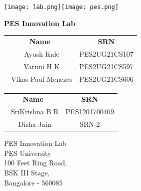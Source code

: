 \documentclass[12pt]{report}
\begin{document}
 

\begin{titlepage}
\texttt{[image: lab.png]}\hfill \texttt{[image: pes.png]}

\begin{center}
\vspace*{1cm}

\textbf{\Large{PES Innovation Lab}}

\vspace{0.3cm}
\vspace{0.1cm}
       
       
\vspace{0.8cm}
            
\vspace{0.8cm}
       
\vspace{0.2cm}
       
\begin{tabular}{c c}    
    \textbf{Name} & 
    \textbf{SRN} \\[0.5cm]
    \ {Ayush Kale} & {PES2UG21CS107} \\
    \ {Varuni H K} & {PES2UG21CS597} \\
    \ {Vikas Paul Menezes} & {PES2UG21CS606} \\         
\end{tabular}
\vspace{0.5cm}

\vspace{0.2cm}
       
\begin{tabular}{c c}
    \textbf{Name} & 
    \textbf{SRN} \\[0.5cm]
    \ {SriKrishna B R} & {PES1201700469} \\
    \ {Disha Jain} & {SRN-2} \\
\end{tabular}
       
\vfill
\vspace{0.5cm}
            
PES Innovation Lab\\
PES University\\
100 Feet Ring Road,\\
BSK III Stage,\\
Bangalore - 560085
            
\end{center}
\end{titlepage}
\end{document}

